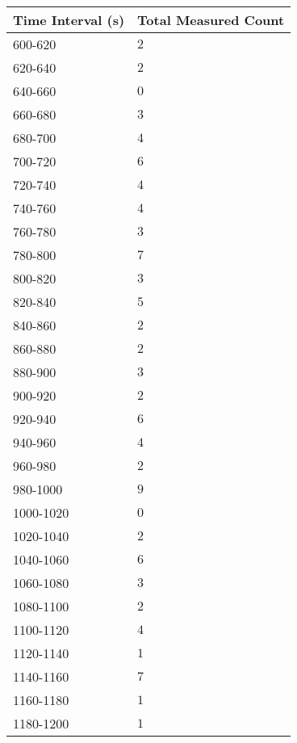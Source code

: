 \begin{tabular}{| p{} | p{}|}\hline
Time Interval (s) & Total Measured Count\\
\hline
600-620 & $2$\\
620-640 & $2$\\
640-660 & $0$\\
660-680 & $3$\\
680-700 & $4$\\
700-720 & $6$\\
720-740 & $4$\\
740-760 & $4$\\
760-780 & $3$\\
780-800 & $7$\\
800-820 & $3$\\
820-840 & $5$\\
840-860 & $2$\\
860-880 & $2$\\
880-900 & $3$\\
900-920 & $2$\\
920-940 & $6$\\
940-960 & $4$\\
960-980 & $2$\\
980-1000 & $9$\\
1000-1020 & $0$\\
1020-1040 & $2$\\
1040-1060 & $6$\\
1060-1080 & $3$\\
1080-1100 & $2$\\
1100-1120 & $4$\\
1120-1140 & $1$\\
1140-1160 & $7$\\
1160-1180 & $1$\\
1180-1200 & $1$\\
\hline
\end{tabular}